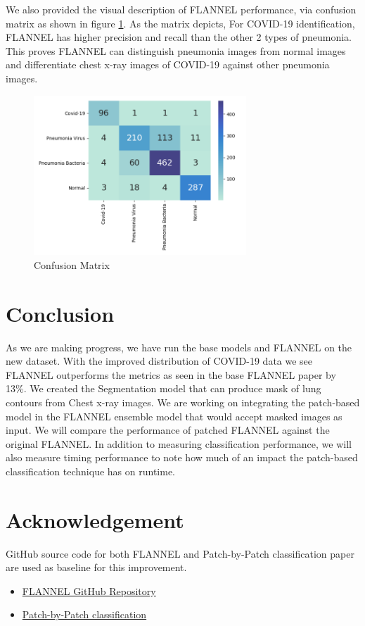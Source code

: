 \documentclass{sigkddExp}
\begin{document}
We also provided the visual description of FLANNEL performance, via confusion
matrix as shown in figure \ref{fig:cfmatrix}. As the matrix depicts, For
COVID-19 identification, FLANNEL has higher precision and recall than the other
2 types of pneumonia. This proves FLANNEL can distinguish pneumonia images from
normal images and differentiate chest x-ray images of COVID-19 against other
pneumonia images.

\begin{figure}[h]
    \includegraphics[width=8cm]{../doc/images/confusion_matrix.png}
    \caption{Confusion Matrix}
    \label{fig:cfmatrix}
\end{figure}

\section{Conclusion}
As we are making progress, we have run the base models and FLANNEL on the new
dataset. With the improved distribution of COVID-19 data we see FLANNEL
outperforms the metrics as seen in the base FLANNEL paper by 13\%. We created the
Segmentation model that can produce mask of lung contours from Chest x-ray
images. We are working on integrating the patch-based model in the FLANNEL
ensemble model that would accept masked images as input. We will compare the
performance of patched FLANNEL against the original FLANNEL. In addition to
measuring classification performance, we will also measure timing performance to
note how much of an impact the patch-based classification technique has on
runtime.

\section{Acknowledgement}
GitHub source code for both FLANNEL and Patch-by-Patch classification
\cite{pmid32396075} paper are used as baseline for this improvement.
\begin{itemize}
    \item \href{https://github.com/qxiaobu/FLANNEL}{FLANNEL GitHub Repository}
    \item \href{https://github.com/jongcye/Deep-Learning-COVID-19-on-CXR-using-Limited-Training-Data-Sets}
          {Patch-by-Patch classification}
\end{itemize}



\clearpage
%

\end{document}
